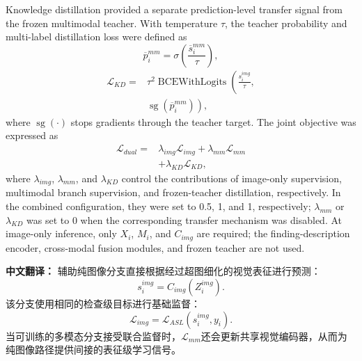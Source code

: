 \documentclass[Afour,sagev,times]{sagej}
\begin{document}
Knowledge distillation provided a separate prediction-level transfer signal from the frozen multimodal teacher. With temperature $\tau$, the teacher probability and multi-label distillation loss were defined as
\begin{equation}
\overline{p}_i^{mm}=\sigma\!\left(\frac{\overline{s}_i^{mm}}{\tau}\right),
\end{equation}
\begin{equation}
\begin{aligned}
\mathcal{L}_{KD}={}&\tau^2\operatorname{BCEWithLogits}\!\left(
\frac{s_i^{img}}{\tau},\right.\\
&\left.\operatorname{sg}(\overline{p}_i^{mm})\right),
\end{aligned}
\end{equation}
where $\operatorname{sg}(\cdot)$ stops gradients through the teacher target. The joint objective was expressed as
\begin{equation}
\begin{aligned}
\mathcal{L}_{dual}={}&\lambda_{img}\mathcal{L}_{img}+\lambda_{mm}\mathcal{L}_{mm}\\
&+\lambda_{KD}\mathcal{L}_{KD},
\end{aligned}
\end{equation}
where $\lambda_{img}$, $\lambda_{mm}$, and $\lambda_{KD}$ control the contributions of image-only supervision, multimodal branch supervision, and frozen-teacher distillation, respectively. In the combined configuration, they were set to 0.5, 1, and 1, respectively; $\lambda_{mm}$ or $\lambda_{KD}$ was set to 0 when the corresponding transfer mechanism was disabled. At image-only inference, only $X_i$, $M_i$, and $C_{img}$ are required; the finding-description encoder, cross-modal fusion modules, and frozen teacher are not used.

\textbf{中文翻译：} 辅助纯图像分支直接根据经过超图细化的视觉表征进行预测：
\begin{equation}
s_i^{img}=C_{img}(Z_i^{img}).
\end{equation}
该分支使用相同的检查级目标进行基础监督：
\begin{equation}
\mathcal{L}_{img}=\mathcal{L}_{ASL}(s_i^{img},y_i).
\end{equation}
当可训练的多模态分支接受联合监督时，$\mathcal{L}_{mm}$还会更新共享视觉编码器，从而为纯图像路径提供间接的表征级学习信号。
\end{document}
